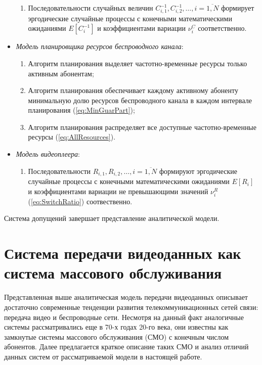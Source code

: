 \begin{itemize}
\begin{enumerate}
			\item Последовательности случайных величин $C^{-1}_{i,1}, C^{-1}_{i,2}, \ldots, i=\overline{1,N}$  формирует эргодические случайные процессы с конечными математическими ожиданиями $E[C_i^{-1}]$ и коэффициентами вариации $\nu^{C}_i$ соответственно.
		\end{enumerate}
	\item \textit{Модель планировщика ресурсов беспроводного канала}:
		\begin{enumerate}
			\item Алгоритм планирования выделяет частотно-временные ресурсы только активным абонентам;
			\item Алгоритм планирования обеспечивает каждому активному абоненту минимальную долю ресурсов беспроводного канала в каждом интервале планирования (\ref{eq:MinGuarPart});
			\item Алгоритм планирования распределяет все доступные частотно-временные ресурсы (\ref{eq:AllResources}).
		\end{enumerate}
	\item \textit{Модель видеоплеера}:
		\begin{enumerate}
			\item Последовательности $R_{i,1}, R_{i,2}, \ldots, i=\overline{1,N}$ формируют эргодические случайные процессы с конечными математическими ожиданиями $E[R_{i}]$ и коэффициентами вариации не превышающими значений $\nu^R_i$ (\ref{eq:SwitchRatio}) соотвественно.
		\end{enumerate}
\end{itemize}
Система допущений завершает представление аналитической модели.

\section{Система передачи видеоданных как система массового обслуживания}
\label{chap2:QueuningNetwork}

Представленная выше аналитическая модель передачи видеоданных описывает достаточно современные тенденции развития телекоммуникационных сетей связи: передача видео и беспроводные сети. Несмотря на данный факт аналогичные системы рассматривались еще в 70-х годах 20-го века, они известны как замкнутые системы массового обслуживания (СМО) с конечным числом абонентов. Далее предлагается краткое описание таких СМО и анализ отличий данных систем от рассматриваемой модели в настоящей работе.

